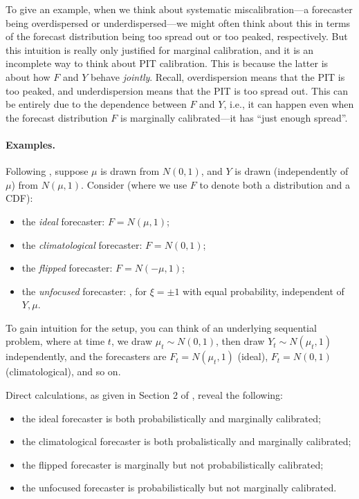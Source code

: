 \documentclass{article}
\begin{document}
To give an example, when we think about systematic miscalibration---a forecaster 
being overdispersed or underdispersed---we might often think about this in terms 
of the forecast distribution being too spread out or too peaked, respectively.
But this intuition is really only justified for marginal calibration, and it is an
incomplete way to think about PIT calibration. This is because the latter is
about how $F$ and $Y$ behave \emph{jointly}. Recall, overdispersion means that
the PIT is too peaked, and underdispersion means that the PIT is too spread
out. This can be entirely due to the dependence between $F$ and $Y$, i.e., it
can happen even when the forecast distribution $F$ is marginally calibrated---it
has ``just enough spread''.

\paragraph{Examples.}

Following \citet{gneiting2007probabilistic}, suppose $\mu$ is drawn from $N(0, 
1)$, and $Y$ is drawn (independently of $\mu$) from $N(\mu, 1)$. Consider (where
we use $F$ to denote both a distribution and a CDF):

\begin{itemize}
\item the \emph{ideal} forecaster: $F = N(\mu, 1)$;
\item the \emph{climatological} forecaster: $F = N(0, 1)$;
\item the \emph{flipped} forecaster: $F = N(-\mu, 1)$;  
\item the \emph{unfocused} forecaster: , for $\xi = \pm 1$ with equal probability, independent 
  of $Y,\mu$.
\end{itemize}

To gain intuition for the setup, you can think of an underlying sequential
problem, where at time $t$, we draw $\mu_t \sim N(0,1)$, then draw $Y_t \sim
N(\mu_t, 1)$ independently, and the forecasters are $F_t = N(\mu_t, 1)$ (ideal),
$F_t = N(0, 1)$ (climatological), and so on.

Direct calculations, as given in Section 2 of \citet{gneiting2007probabilistic}, 
reveal the following: 

\begin{itemize}
\item the ideal forecaster is both probabilistically and marginally calibrated;  
\item the climatological forecaster is both probalistically and marginally
  calibrated;
\item the flipped forecaster is marginally but not probabilistically
  calibrated; 
\item the unfocused forecaster is probabilistically but not marginally
  calibrated.
\end{itemize}
\end{document}
